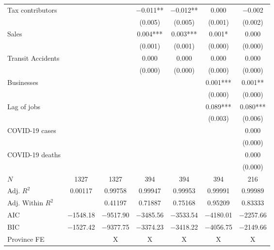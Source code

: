 \documentclass[11pt,a4paper]{article}\usepackage[]{graphicx}\usepackage[]{xcolor}
\begin{document}
\begin{table}[h]
\begin{tabular}[t]{lcccccc}
Tax contributors &  &  & \num{-0.011}** & \num{-0.012}** & \num{0.000} & \num{-0.002}\\
 &  &  & (\num{0.005}) & (\num{0.005}) & (\num{0.001}) & (\num{0.002})\\
Sales &  &  & \num{0.004}*** & \num{0.003}*** & \num{0.001}* & \num{0.000}\\
 &  &  & (\num{0.001}) & (\num{0.001}) & (\num{0.000}) & (\num{0.000})\\
Transit Accidents &  &  & \num{0.000} & \num{0.000} & \num{0.000} & \num{0.000}\\
 &  &  & (\num{0.000}) & (\num{0.000}) & (\num{0.000}) & (\num{0.000})\\
Businesses &  &  &  &  & \num{0.001}*** & \num{0.001}**\\
 &  &  &  &  & (\num{0.000}) & (\num{0.000})\\
Lag of jobs &  &  &  &  & \num{0.089}*** & \num{0.080}***\\
 &  &  &  &  & (\num{0.003}) & (\num{0.006})\\
COVID-19 cases &  &  &  &  &  & \num{0.000}\\
 &  &  &  &  &  & \vphantom{1} (\num{0.000})\\
COVID-19 deaths &  &  &  &  &  & \num{0.000}\\
 &  &  &  &  &  & (\num{0.000})\\
\midrule
$N$ & \num{1327} & \num{1327} & \num{394} & \num{394} & \num{394} & \num{216}\\
Adj. $R^2$ & \num{0.00117} & \num{0.99758} & \num{0.99947} & \num{0.99953} & \num{0.99991} & \num{0.99989}\\
Adj. Within $R^2$ &  & \num{0.41197} & \num{0.71887} & \num{0.75168} & \num{0.95209} & \num{0.83333}\\
AIC & \num{-1548.18} & \num{-9517.90} & \num{-3485.56} & \num{-3533.54} & \num{-4180.01} & \num{-2257.66}\\
BIC & \num{-1527.42} & \num{-9377.75} & \num{-3374.23} & \num{-3418.22} & \num{-4056.75} & \num{-2149.66}\\
Province FE &  & X & X & X & X & X\\
\bottomrule
\end{tabular}


\end{table}
\end{document}
